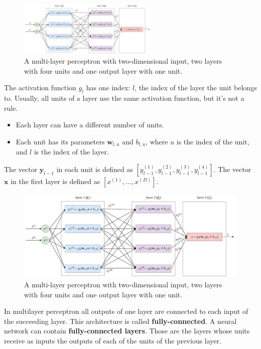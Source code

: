 \documentclass[8pt,dvipsnames]{beamer}
\begin{document}
\begin{frame}
	\begin{figure}
		\centering
		\includegraphics[width=0.6\textwidth]{imgs/nn_1.jpeg}
		\caption{A multi-layer perceptron with two-dimensional input, two layers with four units and one output layer with one unit.}
	\end{figure}
	The activation function $g_{l}$ has one index: $l$, the index of the layer the unit belongs to. Usually, all units of a layer use the same activation function, but it's not a rule.
	\begin{itemize}
		\item Each layer can have a different number of units.
		\item Each unit has its parameters $\mathbf{w}_{l, u}$ and $b_{l, u}$, where $u$ is the index of the unit, and $l$ is the index of the layer.
	\end{itemize}
	The vector $\mathbf{y}_{l-1}$ in each unit is defined as $\left[y_{l-1}^{(1)}, y_{l-1}^{(2)}, y_{l-1}^{(3)}, y_{l-1}^{(4)}\right]$. The vector $\mathbf{x}$ in the first layer is defined as $\left[x^{(1)}, \ldots, x^{(D)}\right]$.
\end{frame}

\begin{frame}
	\begin{figure}
		\centering
		\includegraphics[width=\textwidth]{imgs/nn_1.jpeg}
		\caption{A multi-layer perceptron with two-dimensional input, two layers with four units and one output layer with one unit.}
	\end{figure}
	In multilayer perceptron all outputs of one layer are connected to each input of the succeeding layer. This architecture is called \textbf{fully-connected}. A neural network can contain \textbf{fully-connected layers}. Those are the layers whose units receive as inputs the outputs of each of the units of the previous layer.
\end{frame}
\end{document}
